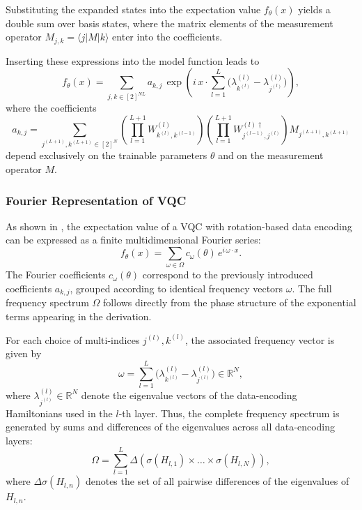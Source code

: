 Substituting the expanded states into the expectation value
$f_\theta(x)$
yields a double sum over basis states, where the matrix elements of the measurement operator
$M_{j,k} = \langle j | M | k \rangle$
enter into the coefficients.

Inserting these expressions into the model function leads to
\begin{equation}
f_\theta(x)
=
\sum_{j,k \in [2]^{N L}}
a_{k,j}\,
\exp\!\left(
i\,x \cdot
\sum_{l=1}^{L}
\bigl(
\lambda^{(l)}_{k^{(l)}} - \lambda^{(l)}_{j^{(l)}}
\bigr)
\right),
\end{equation}
where the coefficients
\begin{equation}
a_{k,j}
=
\sum_{j^{(L+1)},k^{(L+1)} \in [2]^N}
\left(
\prod_{l=1}^{L+1}
W^{(l)}_{k^{(l)},k^{(l-1)}}
\right)
\left(
\prod_{l=1}^{L+1}
W^{(l)\dagger}_{j^{(l-1)},j^{(l)}}
\right)
M_{j^{(L+1)},k^{(L+1)}}
\end{equation}
depend exclusively on the trainable parameters $\theta$ and on the measurement operator $M$.

\subsubsection{Fourier Representation of VQC}
\label{sec:bg-vqc-fourier}

As shown in \cite{schuld2021effect}, the expectation value of a VQC with rotation-based data encoding can be expressed as a finite multidimensional Fourier series:
\begin{equation}
f_\theta(x)
=
\sum_{\omega \in \Omega}
c_\omega(\theta)\,
e^{i\,\omega \cdot x}.
\end{equation}
The Fourier coefficients $c_\omega(\theta)$ correspond to the previously introduced coefficients $a_{k,j}$, grouped according to identical frequency vectors $\omega$.
The full frequency spectrum $\Omega$ follows directly from the phase structure of the exponential terms appearing in the derivation.

For each choice of multi-indices $j^{(l)},k^{(l)}$, the associated frequency vector is given by
\begin{equation}
\omega
=
\sum_{l=1}^{L}
\bigl(
\lambda^{(l)}_{k^{(l)}} - \lambda^{(l)}_{j^{(l)}}
\bigr)
\in \mathbb{R}^N,
\end{equation}
where $\lambda^{(l)}_{j^{(l)}} \in \mathbb{R}^N$ denote the eigenvalue vectors of the data-encoding Hamiltonians used in the $l$-th layer.
Thus, the complete frequency spectrum is generated by sums and differences of the eigenvalues across all data-encoding layers:
\begin{equation}
\Omega = \sum_{l=1}^{L}
\Delta (\sigma(H_{l,1}) \times \dots \times \sigma(H_{l,N})),
\end{equation}
where $\Delta \sigma(H_{l,n})$ denotes the set of all pairwise differences of the eigenvalues of $H_{l,n}$.

